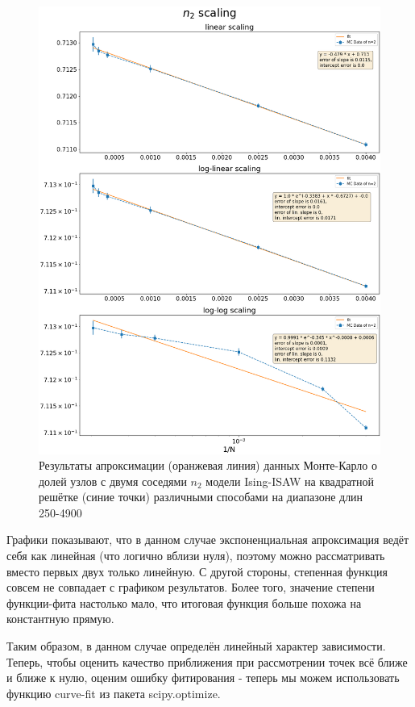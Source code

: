 \begin{figure}[h!]
\begin{minipage}{0.49\textwidth}
    \includegraphics[width=\textwidth]{Sections/Images/square_n2_scaling2.png}
    \caption{Результаты апроксимации (оранжевая линия) данных Монте-Карло о долей узлов с двумя соседями $n_2$ модели Ising-ISAW на квадратной решётке (синие точки) различными способами на диапазоне длин 250-4900}
    \label{fig:square_scale_limited}
\end{minipage}
\end{figure}

Графики показывают, что в данном случае экспоненциальная апроксимация ведёт себя как линейная (что логично вблизи нуля), поэтому можно рассматривать вместо первых двух только линейную. С другой стороны, степенная функция совсем не совпадает с графиком результатов. Более того, значение степени функции-фита настолько мало, что итоговая функция больше похожа на константную прямую.

Таким образом, в данном случае определён линейный характер зависимости. Теперь, чтобы оценить качество приближения при рассмотрении точек всё ближе и ближе к нулю, оценим ошибку фитирования - теперь мы можем использовать функцию curve-fit из пакета scipy.optimize.

